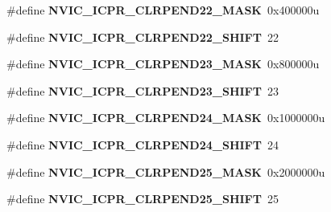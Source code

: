\begin{DoxyCompactItemize}
\item 
\mbox{\label{group___n_v_i_c___register___masks_gaec1907fa7093046e45963c4df83bb654}} 
\#define {\bfseries N\+V\+I\+C\+\_\+\+I\+C\+P\+R\+\_\+\+C\+L\+R\+P\+E\+N\+D22\+\_\+\+M\+A\+SK}~0x400000u
\item 
\mbox{\label{group___n_v_i_c___register___masks_ga0467f3dda1ea857f515adcb12229f645}} 
\#define {\bfseries N\+V\+I\+C\+\_\+\+I\+C\+P\+R\+\_\+\+C\+L\+R\+P\+E\+N\+D22\+\_\+\+S\+H\+I\+FT}~22
\item 
\mbox{\label{group___n_v_i_c___register___masks_ga0792ed0c9fa0fe4f66d3788dae1ff0a7}} 
\#define {\bfseries N\+V\+I\+C\+\_\+\+I\+C\+P\+R\+\_\+\+C\+L\+R\+P\+E\+N\+D23\+\_\+\+M\+A\+SK}~0x800000u
\item 
\mbox{\label{group___n_v_i_c___register___masks_ga0db3b5547705baa260e90b4af6fba4e6}} 
\#define {\bfseries N\+V\+I\+C\+\_\+\+I\+C\+P\+R\+\_\+\+C\+L\+R\+P\+E\+N\+D23\+\_\+\+S\+H\+I\+FT}~23
\item 
\mbox{\label{group___n_v_i_c___register___masks_gad39d3479ec277667d39901e03be03549}} 
\#define {\bfseries N\+V\+I\+C\+\_\+\+I\+C\+P\+R\+\_\+\+C\+L\+R\+P\+E\+N\+D24\+\_\+\+M\+A\+SK}~0x1000000u
\item 
\mbox{\label{group___n_v_i_c___register___masks_ga6f9300a78809d286be3f5cefcec11d1a}} 
\#define {\bfseries N\+V\+I\+C\+\_\+\+I\+C\+P\+R\+\_\+\+C\+L\+R\+P\+E\+N\+D24\+\_\+\+S\+H\+I\+FT}~24
\item 
\mbox{\label{group___n_v_i_c___register___masks_ga9a87841546e02b3663c176acc675e487}} 
\#define {\bfseries N\+V\+I\+C\+\_\+\+I\+C\+P\+R\+\_\+\+C\+L\+R\+P\+E\+N\+D25\+\_\+\+M\+A\+SK}~0x2000000u
\item 
\mbox{\label{group___n_v_i_c___register___masks_ga536c723e540866816f6d880e2d584885}} 
\#define {\bfseries N\+V\+I\+C\+\_\+\+I\+C\+P\+R\+\_\+\+C\+L\+R\+P\+E\+N\+D25\+\_\+\+S\+H\+I\+FT}~25
\item 

\end{DoxyCompactItemize}
